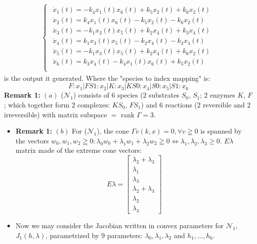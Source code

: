 \documentclass[aspectratio=169]{beamer}
\begin{document}
\begin{frame}
\begin{align*}
	\begin{cases*}
		\begin{array}{ll}
			\dot{x}_1(t) = -k_4 x_1(t) x_6(t)+k_5 x_2(t)+k_6 x_2(t) \\
			\dot{x}_2(t) = k_4 x_1(t) x_6(t)-k_5 x_2(t)-k_6 x_2(t) \\
			\dot{x}_3(t) = -k_1 x_3(t) x_5(t)+k_2 x_4(t)+k_3 x_4(t) \\
			\dot{x}_4(t) = k_1 x_3(t) x_5(t)-k_2 x_4(t)-k_3 x_4(t) \\
			\dot{x}_5(t) = -k_1 x_3(t) x_5(t)+k_2 x_4(t)+k_6 x_2(t) \\
			\dot{x}_6(t) = k_3 x_4(t)-k_4 x_1(t) x_6(t)+k_5 x_2(t) \\
		\end{array}	
	\end{cases*}		
\end{align*}
is the output it generated.
Where the "species to index mapping" is:
\[
	F:  x_1
	| FS1: x_2
	| K: x_3
	| KS0: x_4
	| S0: x_5
	| S1: x_6
\]
\textbf{Remark 1:} $(a)$ ($\mathcal{N}_1$) consists of $6$ species ($2$ substrates $S_0$, $S_1$; $2$ enzymes $K$, $F$; which together form $2$ complexes: $K S_0$, $F S_1$) and $6$ reactions ($2$ reversible and $2$ irreversible) with matrix subspace $=$ rank $\Gamma = 3$.
\end{frame}

\begin{frame}
\begin{itemize}
	\item \textbf{Remark 1:} $(b)$ For ($\mathcal{N}_1$), the cone $\Gamma v(k,x) = 0, \forall v \geqq 0$ is spanned by the vectors $w_0, w_1, w_2 \geqq 0 : \lambda_0 w_0 + \lambda_1 w_1 + \lambda_2 w_2 \geqq 0 \iff \lambda_1, \lambda_2, \lambda_3 \geq 0$.	
		$E\lambda$ matrix made of the extreme cone vectors:
		\[
			E\lambda =
			\begin{bmatrix}
				\lambda_2 + \lambda_3 \\
				\lambda_1 \\
				\lambda_3 \\
				\lambda_2 + \lambda_3 \\
				\lambda_2 \\
				\lambda_3
			\end{bmatrix}
		\]
	\item Now we may consider the Jacobian written in convex parameters for $\mathcal{N}_1$, $J_1(h,\lambda)$, parametrized by $9$ parameters: $\lambda_0, \lambda_1, \lambda_2$ and $h_1, \ldots, h_6$.
\end{itemize}
\end{frame}
\end{document}
